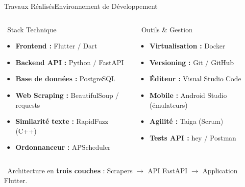 \begin{frame}{Travaux Réalisés}{Environnement de Développement}
  \vspace{0.3cm}
  \begin{columns}[T]
      \begin{block}{\faCode\ Stack Technique}
        \begin{itemize}
          \setlength{\itemsep}{6pt}
          \item \textbf{Frontend :} Flutter / Dart
          \item \textbf{Backend API :} Python / FastAPI
          \item \textbf{Base de données :} PostgreSQL
          \item \textbf{Web Scraping :} BeautifulSoup / requests
          \item \textbf{Similarité texte :} RapidFuzz (C++)
          \item \textbf{Ordonnanceur :} APScheduler
        \end{itemize}
      \end{block}

      \begin{block}{\faTools\ Outils \& Gestion}
        \begin{itemize}
          \setlength{\itemsep}{6pt}
          \item \textbf{Virtualisation :} Docker
          \item \textbf{Versioning :} Git / GitHub
          \item \textbf{Éditeur :} Visual Studio Code
          \item \textbf{Mobile :} Android Studio (émulateurs)
          \item \textbf{Agilité :} Taiga (Scrum)
          \item \textbf{Tests API :} hey / Postman
        \end{itemize}
      \end{block}
  \end{columns}

  \vspace{0.4cm}
  \begin{center}
    \footnotesize \faCogs\ Architecture en \textbf{trois couches} : Scrapers $\rightarrow$ API FastAPI $\rightarrow$ Application Flutter.
  \end{center}
\end{frame}